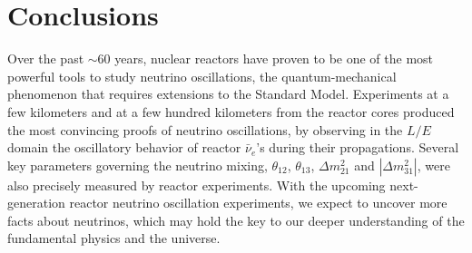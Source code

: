 \section{Conclusions} 
\label{sec:conclusions}

Over the past $\sim$60 years, nuclear reactors have proven to be one of the most powerful tools to study neutrino oscillations, the quantum-mechanical phenomenon that requires extensions to the Standard Model. Experiments at a few kilometers and at a few hundred kilometers from the reactor cores produced the most convincing proofs of neutrino oscillations, by observing in the $L/E$ domain the oscillatory behavior of reactor $\bar\nu_e$'s during their propagations. Several key parameters governing the neutrino mixing, $\theta_{12}$, $\theta_{13}$, $\Delta{m}^2_{21}$ and $|\Delta{m}^2_{31}|$, were also precisely measured by reactor experiments. With the upcoming next-generation reactor neutrino oscillation experiments, we expect to uncover more facts about neutrinos, which may hold the key to our deeper understanding of the fundamental physics and the universe.

